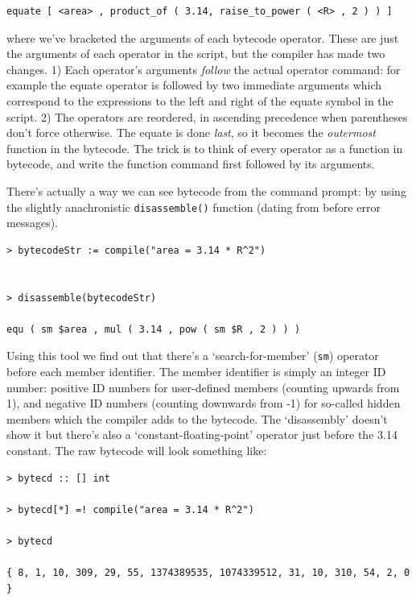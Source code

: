 \documentclass{article}
\newenvironment{code}{
       \begin{list}{}{
               \setlength{\leftmargin}{.4in}
               \setlength{\rightmargin}{0in}
               \setlength{\topsep}{.2in}
       }
       \small
       \item[] }
       { \end{list}   }
\begin{document}
\begin{code} \begin{verbatim}
equate [ <area> , product_of ( 3.14, raise_to_power ( <R> , 2 ) ) ]
\end{verbatim} \end{code}

\noindent where we've bracketed the arguments of each bytecode operator.  These are just the arguments of each operator in the script, but the compiler has made two changes.  1) Each operator's arguments \emph{follow} the actual operator command:  for example the equate operator is followed by two immediate arguments which correspond to the expressions to the left and right of the equate symbol in the script.  2) The operators are reordered, in ascending precedence when parentheses don't force otherwise.  The equate is done \emph{last}, so it becomes the \emph{outermost} function in the bytecode.  The trick is to think of every operator as a function in bytecode, and write the function command first followed by its arguments.

There's actually a way we can see bytecode from the command prompt:  by using the slightly anachronistic \verb#disassemble()# function (dating from before error messages).

\begin{code} \begin{verbatim}
> bytecodeStr := compile("area = 3.14 * R^2")


> disassemble(bytecodeStr)

equ ( sm $area , mul ( 3.14 , pow ( sm $R , 2 ) ) )
\end{verbatim} \end{code}

\noindent Using this tool we find out that there's a `search-for-member' (\verb#sm#) operator before each member identifier.  The member identifier is simply an integer ID number:  positive ID numbers for user-defined members (counting upwards from 1), and negative ID numbers (counting downwards from -1) for so-called hidden members which the compiler adds to the bytecode.  The `disassembly' doesn't show it but there's also a `constant-floating-point' operator just before the 3.14 constant.  The raw bytecode will look something like:

\begin{code} \begin{verbatim}
> bytecd :: [] int

> bytecd[*] =! compile("area = 3.14 * R^2")

> bytecd

{ 8, 1, 10, 309, 29, 55, 1374389535, 1074339512, 31, 10, 310, 54, 2, 0 }
\end{verbatim} \end{code}
\end{document}

